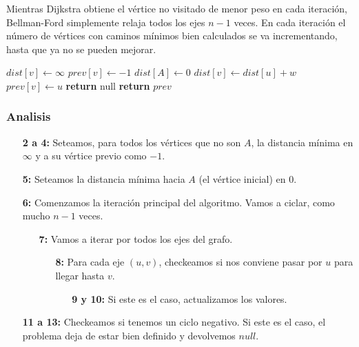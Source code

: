 Mientras Dijkstra obtiene el v\'ertice no visitado de menor peso en cada iteraci\'on, Bellman-Ford simplemente relaja todos los ejes $n-1$ veces. En cada iteraci\'on el n\'umero de v\'ertices con caminos m\'inimos bien calculados se va incrementando, hasta que ya no se pueden mejorar.

\begin{algorithm}
\begin{algorithmic}[1]
    \State $dist[v] \gets \infty$
    \State $prev[v] \gets -1$
  \EndFor
  \State $dist[A] \gets 0$
            \State $dist[v] \gets dist[u] + w$
            \State $prev[v] \gets u$
        \EndIf
    \EndFor
  \EndFor
    
        \State \textbf{return} null
    \EndIf
  \EndFor
  \State \textbf{return} $prev$
\EndFunction
\end{algorithmic}
\end{algorithm}

\subsubsection*{Analisis}

\begin{enumerate}
\item [\textbf{2 a 4:}] Seteamos, para todos los v\'ertices que no son $A$, la distancia m\'inima en $\infty$ y a su v\'ertice previo como $-1$.
\item [\textbf{5:}] Seteamos la distancia m\'inima hacia $A$ (el v\'ertice inicial) en $0$.
\item [\textbf{6:}] Comenzamos la iteraci\'on principal del algoritmo. Vamos a ciclar, como mucho $n-1$ veces.
    \begin{enumerate}
    \item [\textbf{7:}] Vamos a iterar por todos los ejes del grafo.
        \begin{enumerate}
        \item [\textbf{8:}] Para cada eje $(u, v)$, checkeamos si nos conviene pasar por $u$ para llegar hasta $v$.
            \begin{enumerate}
            \item [\textbf{9 y 10:}] Si este es el caso, actualizamos los valores.
            \end{enumerate}
        \end{enumerate}
    \end{enumerate}
\item [\textbf{11 a 13:}] Checkeamos si tenemos un ciclo negativo. Si este es el caso, el problema deja de estar bien definido y devolvemos $null$.
\end{enumerate}

